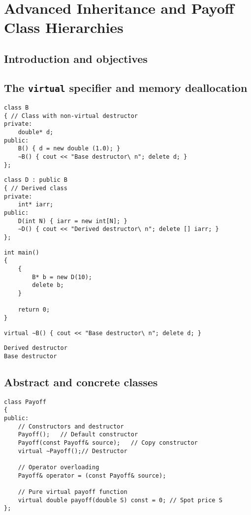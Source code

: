 \chapter{Advanced Inheritance and Payoff Class Hierarchies}

\section{Introduction and objectives}

\section{The \texttt{virtual} specifier and memory deallocation}

\begin{lstlisting}
class B
{ // Class with non-virtual destructor
private:
	double* d;
public:
	B() { d = new double (1.0); }
	∼B() { cout << "Base destructor\ n"; delete d; }
};
\end{lstlisting}

\begin{lstlisting}
class D : public B
{ // Derived class
private:
	int* iarr;
public:
	D(int N) { iarr = new int[N]; }
	∼D() { cout << "Derived destructor\ n"; delete [] iarr; }
};
\end{lstlisting}

\begin{lstlisting}
int main()
{
	{
		B* b = new D(10);
		delete b;
	}

	return 0;
}
\end{lstlisting}

\begin{lstlisting}
virtual ∼B() { cout << "Base destructor\ n"; delete d; }
\end{lstlisting}

\begin{verbatim}
Derived destructor
Base destructor
\end{verbatim}

\section{Abstract and concrete classes}

\begin{lstlisting}
class Payoff
{
public:
	// Constructors and destructor
	Payoff();	// Default constructor
	Payoff(const Payoff& source);	// Copy constructor
	virtual ∼Payoff();// Destructor

	// Operator overloading
	Payoff& operator = (const Payoff& source);

	// Pure virtual payoff function
	virtual double payoff(double S) const = 0; // Spot price S
};
\end{lstlisting}

